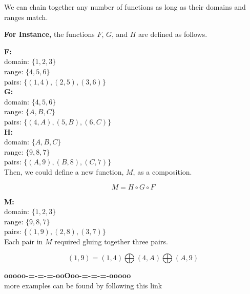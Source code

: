 \documentclass{ximera}
\begin{document}
We can chain together any number of functions as long as their domains and ranges match.



\textbf{For Instance,} the functions $F$, $G$, and $H$ are defined as follows.



\textbf{F:} \\
domain: $\{ 1, 2, 3 \}$ \\
range: $\{ 4, 5, 6 \}$ \\
pairs: $\{ (1, 4), (2, 5) , (3, 6) \}$ \\


\textbf{G:} \\
domain: $\{ 4, 5, 6 \}$ \\
range: $\{ A, B, C \}$ \\
pairs: $\{ (4, A), (5, B), (6, C) \}$ \\



\textbf{H:} \\
domain: $\{ A, B, C \}$ \\
range: $\{ 9, 8, 7 \}$ \\
pairs: $\{ (A, 9), (B, 8), (C, 7) \}$ \\



Then, we could define a new function, $M$, as a composition.

\[ M = H \circ G \circ F \]



\textbf{M:} \\
domain: $\{ 1, 2, 3 \}$ \\
range: $\{ 9, 8, 7 \}$ \\
pairs: $\{ (1, 9), (2, 8) , (3, 7) \}$ \\


Each pair in $M$ required gluing together three pairs.


\[ (1, 9) = (1,4) \bigoplus (4, A) \bigoplus (A, 9) \]

































\begin{onlineOnly}
\begin{center}
\textbf{\textcolor{green!50!black}{ooooo-=-=-=-ooOoo-=-=-=-ooooo}} \\

more examples can be found by following this link\\ 

\end{center}
\end{onlineOnly}
\end{document}
